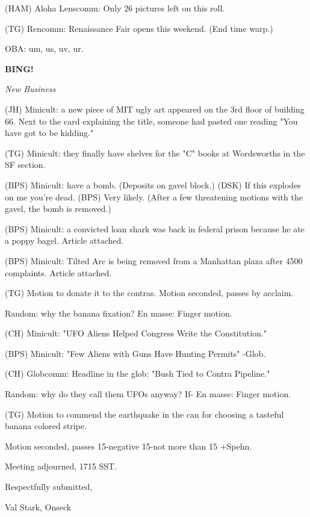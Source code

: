 \documentclass[12pt]{article}
\newcommand{\bing}{{\bf BING!} }
\newcommand{\goto}[1]{\bing \vskip 12pt \centerline{{\em{#1}}}}
\begin{document}
(HAM) Aloha Lenscomm: Only 26 pictures left on this roll.

(TG) Rencomm: Renaissance Fair opens this weekend. (End time warp.)

OBA: um, us, uv, ur.

\goto{New Business}

(JH) Minicult: a new piece of MIT ugly art appeared on the 3rd floor of building 66. Next to the card explaining the title, someone had pasted one reading "You have got to be kidding."

(TG) Minicult: they finally have shelves for the "C" books at Wordsworths in the SF section.

(BPS) Minicult: have a bomb. (Deposits on gavel block.) (DSK) If this explodes on me you're dead. (BPS) Very likely. (After a few threatening motions with the gavel, the bomb is removed.)

(BPS) Minicult: a convicted loan shark was back in federal prison because he ate a poppy bagel. Article attached.

(BPS) Minicult: Tilted Arc is being removed from a Manhattan plaza after 4500 complaints. Article attached.

(TG) Motion to donate it to the contras. Motion seconded, passes by acclaim.

Random: why the banana fixation? En masse: Finger motion.

(CH) Minicult: "UFO Aliens Helped Congress Write the Constitution."

(BPS) Minicult: "Few Aliens with Guns Have Hunting Permits" -Glob.

(CH) Globcomm: Headline in the glob: "Bush Tied to Contra Pipeline."

Random: why do they call them UFOs anyway? If- En masse: Finger motion.

(TG) Motion to commend the earthquake in the can for choosing a tasteful banana colored stripe.

Motion seconded, passes 15-negative 15-not more than 15 +Spehn.

\vspace{12pt}

\noindent
Meeting adjourned, 1715 SST.

\vspace{18pt}

\centerline{Respectfully submitted,}
\centerline{Val Stark, Onseck}
\end{document}
